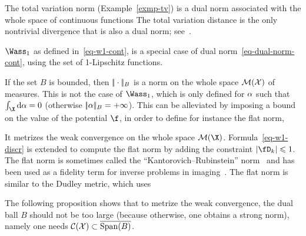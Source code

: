 \begin{example}
The total variation norm (Example~\ref{exmp-tv}) is a dual norm associated with the whole space of continuous functions
The total variation distance is the only nontrivial divergence that is also a dual norm; see~\cite{sriperumbudur2009integral}. 
\end{example}

\begin{example}
$\Wass_1$ as defined in~\eqref{eq-w1-cont}, is a special case of dual norm~\eqref{eq-dual-norm-cont}, using
the set of 1-Lipschitz functions.
\end{example}

\begin{example}
If the set $B$ is bounded, then $|\!| \cdot |\!|_B$ is a norm on the whole space $\mathcal{M}(\mathcal{X})$ of measures.
%
This is not the case of $\Wass_1$, which is only defined for $\alpha$ such that $\int_\X \d\al=0$ (otherwise $|\!| \alpha |\!|_B=+\infty$). 
%
This can be alleviated by imposing a bound on the value of the potential $\f$, in order to define for instance the flat norm, 
 
It metrizes the weak convergence on the whole space $\Mm(\X)$.
% 
Formula~\eqref{eq-w1-discr} is extended to compute the flat norm by adding the constraint $\abs{\fD_k} \leq 1$.
%
The flat norm is sometimes called the ``Kantorovich--Rubinstein'' norm~\cite{hanin1992kantorovich} and has been used as a fidelity term for inverse problems in imaging~\cite{lellmann2014imaging}.
%
The flat norm is  similar to the Dudley metric, which uses
\end{example}

The following proposition shows that to metrize the weak convergence, the dual ball $B$ should not be too large (because otherwise, one obtains a strong norm), namely one needs $\mathcal{C}(\mathcal{X}) \subset \overline{\operatorname{Span}(B)}$.

